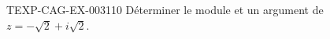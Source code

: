 \begin{exercice}{TEXP-CAG-EX-003}{1}{10}
Déterminer le module et un argument de $z=-\sqrt{2}+i\sqrt{2}$.
\end{exercice}

